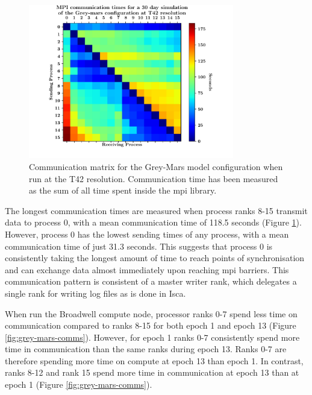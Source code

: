 \documentclass[a4paper,11pt]{report}
\begin{document}
\begin{figure}[H]
\begin{center}
\includegraphics[width=0.8\textwidth]{img/comm_mat_grey-mars.pdf}
\caption[Communication matrix for the Grey-Mars model configuration]{Communication matrix for the Grey-Mars model configuration when run at the T42 resolution. Communication time has been measured as the sum of all time spent inside the \gls{mpi} library.}
\label{fig:comm_mat}
\end{center}
\end{figure}
\par
The longest communication times are measured when process ranks 8-15 transmit data to process 0, with a mean communication time of 118.5 seconds (Figure \ref{fig:comm_mat}). However, process 0 has the lowest sending times of any process, with a mean communication time of just 31.3 seconds. This suggests that process 0 is consistently taking the longest amount of time to reach points of synchronisation and can exchange data almost immediately upon reaching \gls{mpi} barriers. This communication pattern is consistent of a master writer rank, which delegates a single rank for writing log files as is done in Isca.
\par
When run the Broadwell compute node, processor ranks 0-7 spend less time on communication compared to ranks 8-15 for both epoch 1 and epoch 13 (Figure \ref{fig:grey-mars-comms}). However, for epoch 1 ranks 0-7 consistently spend more time in communication than the same ranks during epoch 13. Ranks 0-7 are therefore spending more time on compute at epoch 13 than epoch 1. In contrast, ranks 8-12 and rank 15 spend more time in communication at epoch 13 than at epoch 1 (Figure \ref{fig:grey-mars-comms}). 
\end{document}
